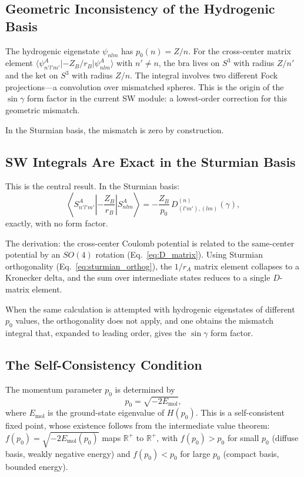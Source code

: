 \documentclass[aps,pra,twocolumn,superscriptaddress,longbibliography]{revtex4-2}
\begin{document}
\subsection{Geometric Inconsistency of the Hydrogenic Basis}

The hydrogenic eigenstate $\psi_{nlm}$ has $p_0(n) = Z/n$.  For
the cross-center matrix element
$\langle \psi^A_{n'l'm'} | {-Z_B/r_B} | \psi^A_{nlm} \rangle$
with $n' \neq n$, the bra lives on $S^3$ with radius $Z/n'$ and the
ket on $S^3$ with radius $Z/n$.  The integral involves two different
Fock projections---a convolution over mismatched spheres.  This is
the origin of the $\sin\gamma$ form factor in the current SW module:
a lowest-order correction for this geometric mismatch.

In the Sturmian basis, the mismatch is zero by construction.

\subsection{SW Integrals Are Exact in the Sturmian Basis}

This is the central result.  In the Sturmian basis:
\begin{equation}
\boxed{
\left\langle S^A_{n'l'm'}\left| -\frac{Z_B}{r_B}\right|
S^A_{nlm}\right\rangle
= -\frac{Z_B}{p_0}\, D^{(n)}_{(l'm'),(lm)}(\gamma),
}
\label{eq:sw_exact}
\end{equation}
exactly, with no form factor.

The derivation: the cross-center Coulomb potential is related to the
same-center potential by an $SO(4)$ rotation (Eq.~\eqref{eq:D_matrix}).
Using Sturmian orthogonality (Eq.~\eqref{eq:sturmian_orthog}), the
$1/r_A$ matrix element collapses to a Kronecker delta, and the sum
over intermediate states reduces to a single $D$-matrix element.

When the same calculation is attempted with hydrogenic eigenstates of
different $p_0$ values, the orthogonality does not apply, and one
obtains the mismatch integral that, expanded to leading order, gives
the $\sin\gamma$ form factor.

\subsection{The Self-Consistency Condition}

The momentum parameter $p_0$ is determined by
\begin{equation}
p_0 = \sqrt{-2E_{\text{mol}}},
\label{eq:self_consistency}
\end{equation}
where $E_{\text{mol}}$ is the ground-state eigenvalue of $H(p_0)$.
This is a self-consistent fixed point, whose existence follows from
the intermediate value theorem: $f(p_0) = \sqrt{-2E_{\text{mol}}(p_0)}$
maps $\mathbb{R}^+$ to $\mathbb{R}^+$, with $f(p_0) > p_0$ for
small $p_0$ (diffuse basis, weakly negative energy) and $f(p_0) < p_0$
for large $p_0$ (compact basis, bounded energy).
\end{document}
